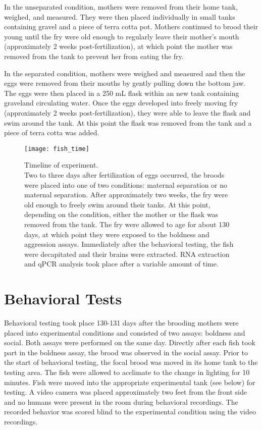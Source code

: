 \documentclass[12pt,twoside]{reedthesis}
\begin{document}
In the unseparated condition, mothers were removed from their home tank,
weighed, and measured. They were then placed individually in small tanks containing gravel
and a piece of terra cotta pot. Mothers continued to brood their young until the
fry were old enough to regularly leave their mother's mouth (approximately 2 weeks post-fertilization), at which point the mother was removed from the tank to prevent her from eating the fry. 

In the separated condition, mothers were weighed and measured and then the eggs
were removed from their mouths by gently pulling down the bottom
jaw. The eggs were then placed in a 250 mL flask within an new tank containing
graveland circulating water. Once
the eggs developed into freely moving fry (approximately 2 weeks
post-fertilization), they were able to leave the flask and swim around the tank.
At this point the flask was removed from the tank and a piece of terra cotta was added.

\begin{figure}[htbp] 
\begin{centering} 
\texttt{[image: fish\_time]}
\caption[Timeline of experiment]{\footnotesize{Timeline of experiment.\\ Two to
    three days after fertilization of eggs occurred, the broods were placed into
  one of two conditions: maternal separation or no maternal separation. After
  approximately two weeks, the fry were old enough to freely swim around their
  tanks. At this point, depending on the condition, either the mother or the
  flask was removed from the tank. The fry were allowed to age for about 130
  days, at which point they were exposed to the boldness and aggression assays.
  Immediately after the behavioral testing, the fish were decapitated and their
  brains were extracted. RNA extraction and qPCR analysis took place after a variable
  amount of time.}} 
\label{subd}
\end{centering} 
\end{figure}

\section{Behavioral Tests}

Behavioral testing took place 130-131 days after the brooding mothers were
placed into experimental conditions and consisted of two assays: boldness and social. Both assays were performed on the same day.
Directly after each fish took part in the boldness assay, the brood was observed in the
social assay.
Prior to the start of behavioral testing, the focal brood was moved in its home tank to the
testing area. The fish were allowed to acclimate to the change in lighting for 10
minutes. Fish were moved into the appropriate experimental tank (see below) for
testing. A video camera was placed approximately two
feet from the front side and no humans were present in the room during behavioral
recordings. The recorded behavior was scored blind to the experimental condition using the video recordings.
\end{document}
